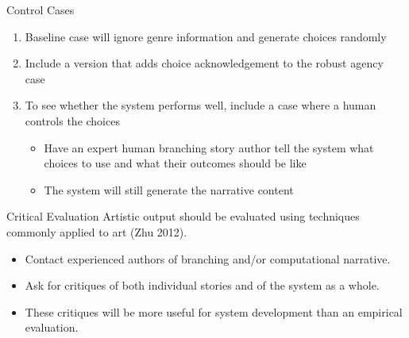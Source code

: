 \documentclass[xcolor=x11names]{beamer}
\begin{document}
\begin{frame}{Control Cases}
  \begin{enumerate}
    \item Baseline case will ignore genre information and generate choices randomly
    \item Include a version that adds choice acknowledgement to the robust agency case
    \item To see whether the system performs well, include a case where a human controls the choices
      \begin{itemize}
        \item Have an expert human branching story author tell the system what choices to use and what their outcomes should be like
        \item The system will still generate the narrative content
      \end{itemize}
  \end{enumerate}
\end{frame}

\begin{frame}{Critical Evaluation}
  Artistic output should be evaluated using techniques commonly applied to art (Zhu 2012).
  \pause
  \begin{itemize}
    \item Contact experienced authors of branching and/or computational narrative.
    \item Ask for critiques of both individual stories and of the system as a whole.
    \item These critiques will be more useful for system development than an empirical evaluation.
  \end{itemize}
\end{frame}
\end{document}
